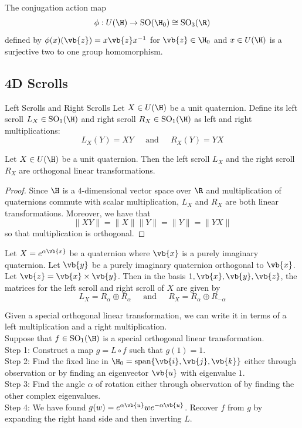 \documentclass[a4paper]{article}
\begin{document}
\begin{thm}{}{} The conjugation action map $$\phi:U(\H)\to\text{SO}(\H_0)\cong\text{SO}_3(\R)$$ defined by $\phi(x)(\vb{z})=x\vb{z}x^{-1}$ for $\vb{z}\in\H_0$ and $x\in U(\H)$ is a surjective two to one group homomorphism. 
\end{thm}

\subsection{4D Scrolls}
\begin{defn}{Left Scrolls and Right Scrolls}{} Let $X\in U(\H)$ be a unit quaternion. Define its left scroll $L_X\in\text{SO}_1(\H)$ and right scroll $R_X\in\text{SO}_1(\H)$ as left and right multiplications: $$L_X(Y)=XY\;\;\;\;\text{ and }\;\;\;\; R_X(Y)=YX$$
\end{defn}

\begin{lmm}{}{} Let $X\in U(\H)$ be a unit quaternion. Then the left scroll $L_X$ and the right scroll $R_X$ are orthogonal linear transformations. 
\begin{proof}
Since $\H$ is a $4$-dimensional vector space over $\R$ and multiplication of quaternions commute with scalar multiplication, $L_X$ and $R_X$ are both linear transformations. Moreover, we have that $$\|XY\|=\|X\|\|Y\|=\|Y\|=\|YX\|$$ so that multiplication is orthogonal. 
\end{proof}
\end{lmm}

\begin{lmm}{}{} Let $X=e^{\alpha\vb{x}}$ be a quaternion where $\vb{x}$ is a purely imaginary quaternion. Let $\vb{y}$ be a purely imaginary quaternion orthogonal to $\vb{x}$. Let $\vb{z}=\vb{x}\times\vb{y}$. Then in the basis $1,\vb{x},\vb{y},\vb{z}$, the matrices for the left scroll and right scroll of $X$ are given by $$L_X=R_\alpha\oplus R_\alpha\;\;\;\;\text{ and }\;\;\;\; R_X=R_\alpha\oplus R_{-\alpha}$$
\end{lmm}

Given a special orthogonal linear transformation, we can write it in terms of a left multiplication and a right multiplication. \\

Suppose that $f\in\text{SO}_1(\H)$ is a special orthogonal linear transformation. \\
Step 1: Construct a map $g=L\circ f$ such that $g(1)=1$. \\
Step 2: Find the fixed line in $\H_0=\text{span}\{\vb{i},\vb{j},\vb{k}\}$ either through observation or by finding an eigenvector $\vb{u}$ with eigenvalue $1$. \\
Step 3: Find the angle $\alpha$ of rotation either through observation of by finding the other complex eigenvalues. \\
Step 4: We have found $g(w)=e^{\alpha\vb{u}}we^{-\alpha\vb{u}}$. Recover $f$ from $g$ by expanding the right hand side and then inverting $L$. 
\end{document}
